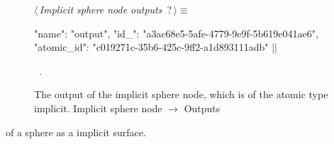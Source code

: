 \documentclass[%
    a4paper,    %
    justified,  %
    nobib,      %
    openany     %
]{tufte-book}
\makeatletter
\renewcommand{\label}[1]{\@tufte@label{##1}}%
\makeatother
\begin{document}
\begin{figure}
\begin{flushleft} \small
\begin{minipage}{\linewidth}\label{scrap101}\raggedright\small
{} $\langle\,${\itshape Implicit sphere node outputs}\nobreak\ {\footnotesize {?}}$\,\rangle\equiv$
\vspace{-1ex}
\begin{pythoncode}
{
    "name": "output",
    "id_": "a3ac68e5-5afe-4779-9e9f-5b619e041ae6",
    "atomic_id": "c019271c-35b6-425c-9ff2-a1d893111adb"
}|\NWsep|
\end{pythoncode}
\vspace{1.5ex}
\footnotesize
\begin{list}{}{\setlength{\itemsep}{-\parsep}\setlength{\itemindent}{-\leftmargin}}
\item \NWtxtMacroRefIn\ .

\item{}
\end{list}
\end{minipage}\vspace{4ex}
\end{flushleft}
\caption{The output of the implicit sphere node, which is of the atomic type
  implicit.
  \newline{}\newline{}Implicit sphere node $\rightarrow$ Outputs}
\label{editor:lst:nodes:sphere-node:outputs:implicit}
\end{figure}

 of a sphere
as a implicit surface.
\end{document}
